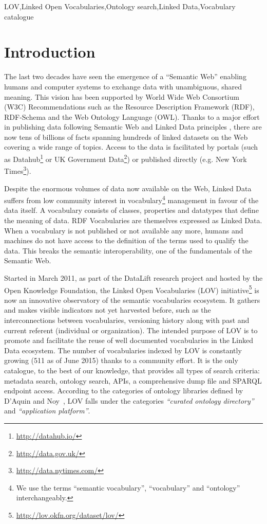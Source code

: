 \documentclass{iosart2c}
\begin{document}
\begin{frontmatter}
\begin{keyword}
LOV\sep Linked Open Vocabularies\sep Ontology search\sep Linked Data\sep Vocabulary catalogue
\end{keyword}

\end{frontmatter}


\section{Introduction}
The last two decades have seen the emergence of a ``Semantic Web'' enabling humans and computer systems to exchange data with unambiguous, shared meaning. This vision has been supported by World Wide Web Consortium (W3C) Recommendations such as the Resource Description Framework (RDF), RDF-Schema and the Web Ontology Language (OWL). Thanks to a major effort in publishing data following Semantic Web and Linked Data principles \cite{timld}, there are now tens of billions of facts spanning hundreds of linked datasets on the Web covering a wide range of topics. Access to the data is facilitated by portals (such as Datahub\footnote{\url{http://datahub.io/}} or UK Government Data\footnote{\url{http://data.gov.uk/}}) or published directly (e.g. New York Times\footnote{\url{http://data.nytimes.com/}}). 

Despite the enormous volumes of data now available on the Web, Linked Data suffers from low community interest in vocabulary\footnote{We use the terms ``semantic vocabulary'', ``vocabulary'' and ``ontology'' interchangeably.} management in favour of the data itself. A vocabulary consists of classes, properties and datatypes that define the meaning of data. RDF Vocabularies are themselves expressed as Linked Data. When a vocabulary is not published or not available any more, humans and machines do not have access to the definition of the terms used to qualify the data. This breaks the semantic interoperability, one of the fundamentals of the Semantic Web. 

Started in March 2011, as part of the DataLift research project \cite{scharffe_2012} and hosted by the Open Knowledge Foundation, the Linked Open Vocabularies (LOV) initiative\footnote{\url{http://lov.okfn.org/dataset/lov/}} is now an innovative observatory of the semantic vocabularies ecosystem. It gathers and makes visible indicators not yet harvested before, such as the interconnections between vocabularies, versioning history along with past and current referent (individual or organization). The intended purpose of LOV is to promote and facilitate the reuse of well documented vocabularies in the Linked Data ecosystem. The number of vocabularies indexed by LOV is constantly growing (511 as of June 2015) thanks to a community effort. It is the only catalogue, to the best of our knowledge, that provides all types of search criteria: metadata search, ontology search, APIs, a comprehensive dump file and SPARQL endpoint access. According to the categories of ontology libraries defined by D'Aquin and Noy~\cite{AquinJoWS12}, LOV falls under the categories \textit{``curated ontology directory''}  and \textit{``application platform''}. 
\end{document}
